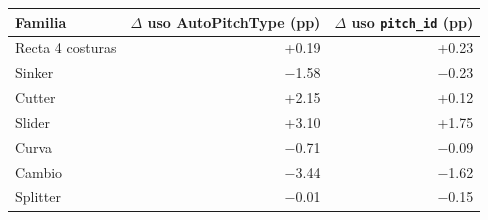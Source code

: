 \begin{tabular}{lrr}
\toprule
Familia & $\Delta$ uso AutoPitchType (pp) & $\Delta$ uso \texttt{pitch\_id} (pp) \\
\midrule
Recta 4 costuras & +0.19 & +0.23 \\
Sinker & \ensuremath{-}1.58 & \ensuremath{-}0.23 \\
Cutter & +2.15 & +0.12 \\
Slider & +3.10 & +1.75 \\
Curva & \ensuremath{-}0.71 & \ensuremath{-}0.09 \\
Cambio & \ensuremath{-}3.44 & \ensuremath{-}1.62 \\
Splitter & \ensuremath{-}0.01 & \ensuremath{-}0.15 \\
\bottomrule
\end{tabular}
